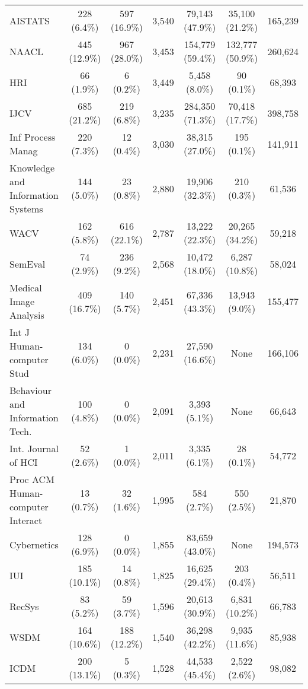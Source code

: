 \begin{tabular}{l|ccc|ccc}
AISTATS & 228 (6.4\%) & 597 (16.9\%) & 3,540 & 79,143 (47.9\%) & 35,100 (21.2\%) & 165,239 \\
NAACL & 445 (12.9\%) & 967 (28.0\%) & 3,453 & 154,779 (59.4\%) & 132,777 (50.9\%) & 260,624 \\
HRI & 66 (1.9\%) & 6 (0.2\%) & 3,449 & 5,458 (8.0\%) & 90 (0.1\%) & 68,393 \\
IJCV & 685 (21.2\%) & 219 (6.8\%) & 3,235 & 284,350 (71.3\%) & 70,418 (17.7\%) & 398,758 \\
Inf Process Manag & 220 (7.3\%) & 12 (0.4\%) & 3,030 & 38,315 (27.0\%) & 195 (0.1\%) & 141,911 \\
\makecell[l]{Knowledge and \\ Information Systems} & 144 (5.0\%) & 23 (0.8\%) & 2,880 & 19,906 (32.3\%) & 210 (0.3\%) & 61,536 \\
WACV & 162 (5.8\%) & 616 (22.1\%) & 2,787 & 13,222 (22.3\%) & 20,265 (34.2\%) & 59,218 \\
SemEval & 74 (2.9\%) & 236 (9.2\%) & 2,568 & 10,472 (18.0\%) & 6,287 (10.8\%) & 58,024 \\
Medical Image Analysis & 409 (16.7\%) & 140 (5.7\%) & 2,451 & 67,336 (43.3\%) & 13,943 (9.0\%) & 155,477 \\
\makecell[l]{Int J \\Human-computer Stud} & 134 (6.0\%) & 0 (0.0\%) & 2,231 & 27,590 (16.6\%) & None & 166,106 \\
\makecell[l]{Behaviour and \\ Information Tech.} & 100 (4.8\%) & 0 (0.0\%) & 2,091 & 3,393 (5.1\%) & None & 66,643 \\
Int. Journal of HCI & 52 (2.6\%) & 1 (0.0\%) & 2,011 & 3,335 (6.1\%) & 28 (0.1\%) & 54,772 \\
\makecell[l]{Proc ACM \\ Human-computer Interact} & 13 (0.7\%) & 32 (1.6\%) & 1,995 & 584 (2.7\%) & 550 (2.5\%) & 21,870 \\
Cybernetics & 128 (6.9\%) & 0 (0.0\%) & 1,855 & 83,659 (43.0\%) & None & 194,573 \\
IUI & 185 (10.1\%) & 14 (0.8\%) & 1,825 & 16,625 (29.4\%) & 203 (0.4\%) & 56,511 \\
RecSys & 83 (5.2\%) & 59 (3.7\%) & 1,596 & 20,613 (30.9\%) & 6,831 (10.2\%) & 66,783 \\
WSDM & 164 (10.6\%) & 188 (12.2\%) & 1,540 & 36,298 (42.2\%) & 9,935 (11.6\%) & 85,938 \\
ICDM & 200 (13.1\%) & 5 (0.3\%) & 1,528 & 44,533 (45.4\%) & 2,522 (2.6\%) & 98,082 \\

\end{tabular}
